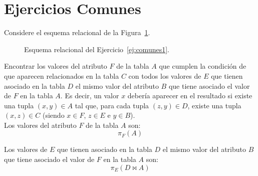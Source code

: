 \documentclass[12pt]{article}
\begin{document}
\newpage
\section{Ejercicios Comunes}

\begin{ejercicio}[AR]\label{ej:comunes1}
    Considere el esquema relacional de la Figura~\ref{fig:comunes1}.
    \begin{figure}[H]
        \centering
        \caption{Esquema relacional del Ejercicio~\ref{ej:comunes1}.}
        \label{fig:comunes1}
    \end{figure}

    Encontrar los valores del atributo $F$ de la tabla $A$ que cumplen la condición de que aparecen relacionados en la tabla $C$ con todos los valores de $E$ que tienen asociado en la tabla $D$ el mismo valor del atributo $B$ que tiene asociado el valor de $F$ en la tabla $A$. Es decir, un valor $x$ debería aparecer en el resultado si existe una tupla $(x,y)\in A$ tal que, para cada tupla $(z,y)\in D$, existe una tupla $(x,z)\in C$ (siendo $x\in F$, $z \in E$ e $y\in B$).\\

    Los valores del atributo $F$ de la tabla $A$ son:
    \begin{equation*}
        \pi_{F}(A)
    \end{equation*}

    Los valores de $E$ que tienen asociado en la tabla $D$ el mismo valor del atributo $B$ que tiene asociado el valor de $F$ en la tabla $A$ son:
    \begin{equation*}
        \pi_{E}(D \bowtie A)
    \end{equation*}


\end{ejercicio}
\end{document}
